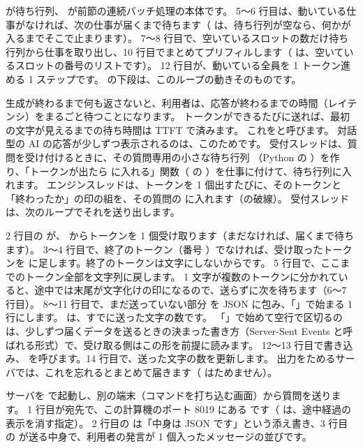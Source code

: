  が待ち行列、 が前節の連続バッチ処理の本体です。
5〜6 行目は、動いている仕事がなければ、次の仕事が届くまで待ちます（ は、待ち行列が空なら、何かが入るまでそこで止まります）。
7〜8 行目で、空いているスロットの数だけ待ち行列から仕事を取り出し、10 行目でまとめてプリフィルします（ は、空いているスロットの番号のリストです）。
12 行目が、動いている全員を 1 トークン進める 1 ステップです。
の下段は、このループの動きそのものです。

生成が終わるまで何も返さないと、利用者は、応答が終わるまでの時間（レイテンシ）をまるごと待つことになります。
トークンができるたびに送れば、最初の文字が見えるまでの待ち時間は TTFT で済みます。
これをと呼びます。
対話型の AI の応答が少しずつ表示されるのは、このためです。
受付スレッドは、質問を受け付けるときに、その質問専用の小さな待ち行列 （Python の ）を作り、「トークンが出たら  に入れる」関数（ の ）を仕事に付けて、待ち行列に入れます。
エンジンスレッドは、トークンを 1 個出すたびに、そのトークンと「終わったか」の印の組を、その質問の  に入れます（の破線）。
受付スレッドは、次のループでそれを送り出します。


2 行目の  が、 からトークンを 1 個受け取ります（まだなければ、届くまで待ちます）。
3〜4 行目で、終了のトークン（番号 ）でなければ、受け取ったトークンを  に足します。終了のトークンは文字にしないからです。
5 行目で、ここまでのトークン全部を文字列に戻します。
1 文字が複数のトークンに分かれていると、途中では末尾が文字化けの印になるので、送らずに次を待ちます（6〜7 行目）。
8〜11 行目で、まだ送っていない部分  を JSON に包み、「」で始まる 1 行にします。
 は、すでに送った文字の数です。
「」で始めて空行で区切るのは、少しずつ届くデータを送るときの決まった書き方（Server-Sent Events と呼ばれる形式）で、受け取る側はこの形を前提に読みます。
12〜13 行目で書き込み、 を呼びます。14 行目で、送った文字の数を更新します。
出力をためるサーバでは、これを忘れるとまとめて届きます（ はためません）。

サーバを  で起動し、別の端末（コマンドを打ち込む画面）から質問を送ります。
1 行目が宛先で、この計算機のポート 8019 にある  です（ は、途中経過の表示を消す指定）。
2 行目の  は「中身は JSON です」という添え書き、3 行目の  が送る中身で、利用者の発言が 1 個入ったメッセージの並びです。

